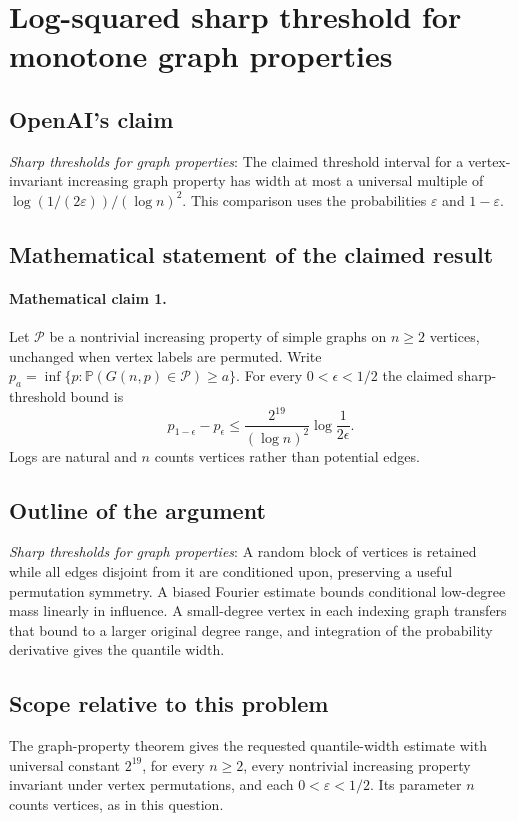 \documentclass[11pt]{article}
\begin{document}
\section*{Log-squared sharp threshold for monotone graph properties}

\subsection{OpenAI's claim}
\textit{Sharp thresholds for graph properties}: The claimed threshold interval for a vertex-invariant increasing graph property has width at most a universal multiple of $\log(1/(2\varepsilon))/(\log n)^2$. This comparison uses the probabilities $\varepsilon$ and $1-\varepsilon$.

\subsection{Mathematical statement of the claimed result}
\paragraph{Mathematical claim 1.} Let $\mathcal P$ be a nontrivial increasing property of simple graphs on $n\ge2$ vertices, unchanged when vertex labels are permuted. Write $p_a=\inf\{p:\mathbb P(G(n,p)\in\mathcal P)\ge a\}$. For every $0<\epsilon<1/2$ the claimed sharp-threshold bound is \[p_{1-\epsilon}-p_\epsilon\le\frac{2^{19}}{(\log n)^2}\log\frac1{2\epsilon}.\] Logs are natural and $n$ counts vertices rather than potential edges.

\subsection{Outline of the argument}
\textit{Sharp thresholds for graph properties}: A random block of vertices is retained while all edges disjoint from it are conditioned upon, preserving a useful permutation symmetry. A biased Fourier estimate bounds conditional low-degree mass linearly in influence. A small-degree vertex in each indexing graph transfers that bound to a larger original degree range, and integration of the probability derivative gives the quantile width.

\subsection{Scope relative to this problem}
The graph-property theorem gives the requested quantile-width estimate with universal constant $2^{19}$, for every $n\ge2$, every nontrivial increasing property invariant under vertex permutations, and each $0<\varepsilon<1/2$. Its parameter $n$ counts vertices, as in this question.
\end{document}
